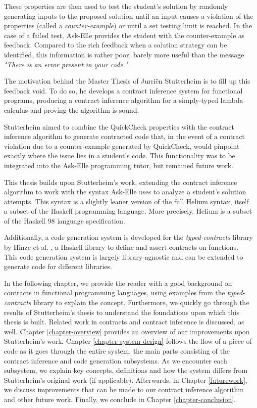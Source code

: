 \documentclass[10pt]{report}
\begin{document}
These properties are then used to test the student's solution by randomly generating inputs to the proposed solution until an input causes a violation of the properties (called a \textit{counter-example}) or until a set testing limit is reached.
In the case of a failed test, Ask-Elle provides the student with the counter-example as feedback.
Compared to the rich feedback when a solution strategy can be identified, this information is rather poor, barely more useful than the message \textit{"There is an error present in your code."}

The motivation behind the Master Thesis of Jurri\"en Stutterheim \cite{Stutterheim:2013:thesis} is to fill up this feedback void.
To do so, he develops a contract inference system for functional programs, producing a contract inference algorithm for a simply-typed lambda calculus and proving the algorithm is sound.

Stutterheim aimed to combine the QuickCheck properties with the contract inference algorithm to generate contracted code that, in the event of a contract violation due to a counter-example generated by QuickCheck, would pinpoint exactly where the issue lies in a student's code.
This functionality was to be integrated into the Ask-Elle programming tutor, but remained future work.

This thesis builds upon Stutterheim's work, extending the contract inference algorithm to work with the syntax Ask-Elle uses to analyze a student's solution attempts.
This syntax is a slightly leaner version of the full Helium syntax, itself a subset of the Haskell programming language.
More precisely, Helium is a subset of the Haskell 98 language specification.

Additionally, a code generation system is developed for the \textit{typed-contracts} library by Hinze et al. \cite{Hinze06typedcontracts}, a Haskell library to define and assert contracts on functions.
This code generation system is largely library-agnostic and can be extended to generate code for different libraries.

In the following chapter, we provide the reader with a good background on contracts in functional programming languages, using examples from the \textit{typed-contracts} library to explain the concept.
Furthermore, we quickly go through the results of Stutterheim's thesis to understand the foundations upon which this thesis is built.
Related work in contracts and contract inference is discussed, as well.
Chapter \ref{chapter-overview} provides an overview of our improvements upon Stutterheim's work.
Chapter \ref{chapter-system-design} follows the flow of a piece of code as it goes through the entire system, the main parts consisting of the contract inference and code generation subsystems.
As we encounter each subsystem, we explain key concepts, definitions and how the system differs from Stutterheim's original work (if applicable).
Afterwards, in Chapter \ref{futurework}, we discuss improvements that can be made to our contract inference algorithm and other future work.
Finally, we conclude in Chapter \ref{chapter-conclusion}.
\end{document}
